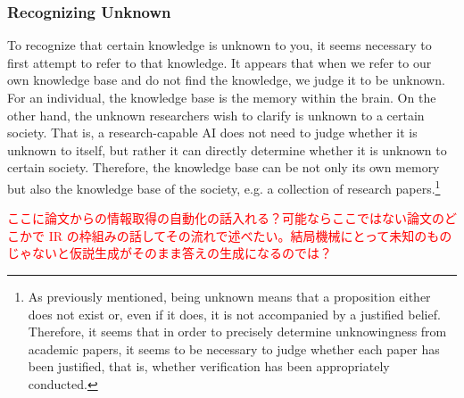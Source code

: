 
\subsubsection{Recognizing Unknown}
To recognize that certain knowledge is unknown to you, it seems necessary to first attempt to refer to that knowledge. It appears that when we refer to our own knowledge base and do not find the knowledge, we judge it to be unknown. For an individual, the knowledge base is the memory within the brain. On the other hand, the unknown researchers wish to clarify is unknown to a certain society. That is, a research-capable AI does not need to judge whether it is unknown to itself, but rather it can directly determine whether it is unknown to certain society. Therefore, the knowledge base can be not only its own memory but also the knowledge base of the society, e.g. a collection of research papers.\footnote{
As previously mentioned, being unknown means that a proposition either does not exist or, even if it does, it is not accompanied by a justified belief. Therefore, it seems that in order to precisely determine unknowingness from academic papers, it seems to be necessary to judge whether each paper has been justified, that is, whether verification has been appropriately conducted. 
}

\textcolor{red}{ここに論文からの情報取得の自動化の話入れる？可能ならここではない論文のどこかで IR の枠組みの話してその流れで述べたい。結局機械にとって未知のものじゃないと仮説生成がそのまま答えの生成になるのでは？}

